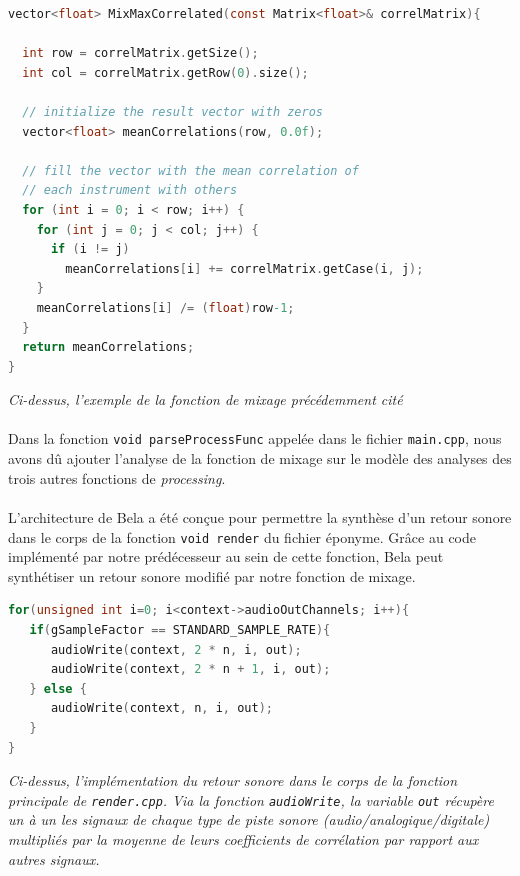 \begin{lstlisting}[language=C, frame=single, breaklines=true]
vector<float> MixMaxCorrelated(const Matrix<float>& correlMatrix){

  int row = correlMatrix.getSize();
  int col = correlMatrix.getRow(0).size();

  // initialize the result vector with zeros
  vector<float> meanCorrelations(row, 0.0f);

  // fill the vector with the mean correlation of
  // each instrument with others
  for (int i = 0; i < row; i++) {
    for (int j = 0; j < col; j++) {
      if (i != j)
        meanCorrelations[i] += correlMatrix.getCase(i, j);
    }
    meanCorrelations[i] /= (float)row-1;
  }
  return meanCorrelations;
}
\end{lstlisting}

\begin{center}
 \textit{Ci-dessus, l'exemple de la fonction de mixage précédemment cité}
\end{center}

\paragraph{}
Dans la fonction \verb!void parseProcessFunc!  appelée dans le fichier
\verb!main.cpp!, nous avons dû ajouter l'analyse de la fonction de
mixage sur le modèle des analyses des trois autres fonctions de
\textit{processing}.

\paragraph{}
L'architecture de Bela a été conçue pour permettre la synthèse d'un
retour sonore dans le corps de la fonction \verb!void render! du
fichier éponyme. Grâce au code implémenté par notre prédécesseur au
sein de cette fonction, Bela peut synthétiser un retour sonore modifié
par notre fonction de mixage.

\begin{lstlisting}[language=C, frame=single, breaklines=true]
for(unsigned int i=0; i<context->audioOutChannels; i++){
   if(gSampleFactor == STANDARD_SAMPLE_RATE){
      audioWrite(context, 2 * n, i, out);
      audioWrite(context, 2 * n + 1, i, out);
   } else {
      audioWrite(context, n, i, out);
   }
}
\end{lstlisting}

\begin{center} \textit{Ci-dessus, l'implémentation du retour sonore
  dans le corps de la fonction principale de \verb!render.cpp!. Via la
  fonction \verb!audioWrite!, la variable \verb!out! récupère un à un
  les signaux de chaque type de piste sonore
  (audio/analogique/digitale) multipliés par la moyenne de leurs
  coefficients de corrélation par rapport aux autres
  signaux.} \end{center}
 
